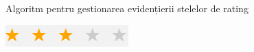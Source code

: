 \documentclass{beamer}
\begin{document}
\begin{darkframes}
		\begin{frame}[c]{Algoritm pentru gestionarea evidențierii stelelor de rating}
			\vspace{-2em}
			\sleepSortt
			\begin{center}
				\vspace{2em}
				\begin{minipage}[t]{0.5\textwidth}
					\centering
					\includegraphics[width=\textwidth]{stele.png}
				\end{minipage}
			\end{center}
		\end{frame}
		

\end{darkframes}
\end{document}
